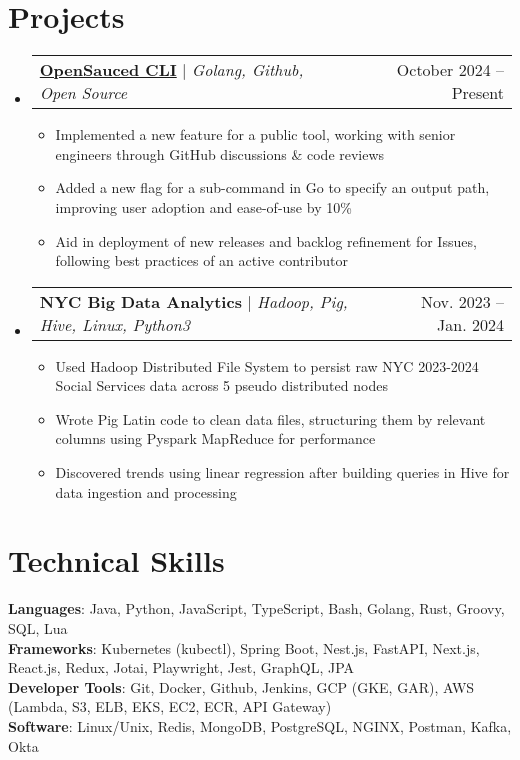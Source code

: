 \documentclass[letterpaper,11pt]{article}
\makeatletter
\newcommand{\resumeItem}[1]{
  \item\small{
    {#1 \vspace{-2pt}}
  }
}
\newcommand{\resumeProjectHeading}[2]{
    \item
    \begin{tabular*}{0.97\textwidth}{l@{\extracolsep{\fill}}r}
      \small#1 & #2 \\
    \end{tabular*}\vspace{-7pt}
}
\newcommand{\resumeSubHeadingListStart}{\begin{itemize}[leftmargin=0.15in, label={}]}
\newcommand{\resumeSubHeadingListEnd}{\end{itemize}}
\newcommand{\resumeItemListStart}{\begin{itemize}}
\newcommand{\resumeItemListEnd}{\end{itemize}\vspace{-5pt}}
\makeatother
\begin{document}
\section{Projects}
    \resumeSubHeadingListStart
      \resumeProjectHeading
          {\textbf{\href{https://github.com/open-sauced/pizza-cli}{OpenSauced CLI}} $|$ \emph{Golang, Github, Open Source}}{October 2024 -- Present}
          \resumeItemListStart
            \resumeItem{Implemented a new feature for a public tool, working with senior engineers through GitHub discussions \& code reviews}
            \resumeItem{Added a new flag for a sub-command in Go to specify an output path, improving user adoption and ease-of-use by 10\%} 
            \resumeItem{Aid in deployment of new releases and backlog refinement for Issues, following best practices of an active contributor}
          \resumeItemListEnd
      \resumeProjectHeading
          {\textbf{NYC Big Data Analytics} $|$ \emph{Hadoop, Pig, Hive, Linux, Python3}}{Nov. 2023 -- Jan. 2024}
          \resumeItemListStart
            \resumeItem{Used Hadoop Distributed File System to persist raw NYC 2023-2024 Social Services data across 5 pseudo distributed nodes}
            \resumeItem{Wrote Pig Latin code to clean data files, structuring them by relevant columns using Pyspark MapReduce for performance}
            \resumeItem{Discovered trends using linear regression after building queries in Hive for data ingestion and processing}
          \resumeItemListEnd
    \resumeSubHeadingListEnd
%
\section{Technical Skills}
 \begin{itemize}[leftmargin=0.15in, label={}]
    \small{\item{
     \textbf{Languages}{: Java, Python, JavaScript, TypeScript, Bash, Golang, Rust, Groovy, SQL, Lua} \\
     \textbf{Frameworks}{: Kubernetes (kubectl), Spring Boot, Nest.js, FastAPI, Next.js, React.js, Redux, Jotai, Playwright, Jest, GraphQL, JPA} \\
     \textbf{Developer Tools}{: Git, Docker, Github, Jenkins, GCP (GKE, GAR), AWS (Lambda, S3, ELB, EKS, EC2, ECR, API Gateway)} \\
     \textbf{Software}{: Linux/Unix, Redis, MongoDB, PostgreSQL, NGINX, Postman, Kafka, Okta}
    }}
 \end{itemize}


\end{document}
